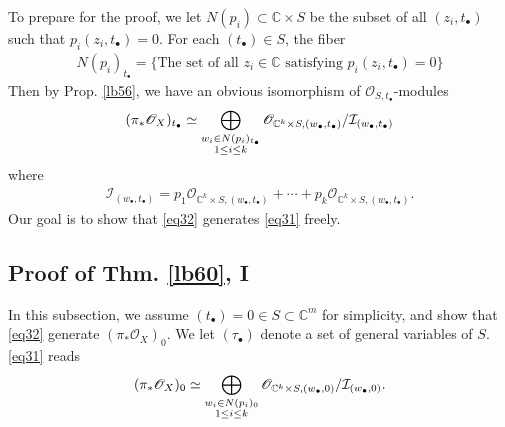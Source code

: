 \documentclass[12pt,b5paper,notitlepage]{report}
\theoremstyle{definition}
\theoremstyle{plain}
\newcommand{\mc}{\mathcal}
\newcommand{\scr}{\mathscr}
\newcommand{\blt}{\bullet}
\newcommand{\Cbb}{\mathbb C}
\numberwithin{equation}{section}
\begin{document}
To prepare for the proof, we let $N(p_i)\subset \Cbb\times S$ be the subset of all $(z_i,t_\blt)$ such that $p_i(z_i,t_\blt)=0$. For each $(t_\blt)\in S$, the fiber
\begin{align*}
N(p_i)_{t_\blt}=\{\text{The set of all  $z_i\in\Cbb$ satisfying $p_i(z_i,t_\blt)=0$}\}
\end{align*}
Then by Prop. \ref{lb56}, we have an obvious isomorphism of $\scr O_{S,t_\blt}$-modules
\begin{align}
(\pi_*\scr O_X)_{t_\blt}\simeq\bigoplus_{\begin{subarray}{c}
w_i\in N(p_i)_{t_\blt}\\
1\leq i\leq k
\end{subarray}} \scr O_{\Cbb^k\times S,(w_\blt,t_\blt)}/\mc I_{(w_\blt,t_\blt)}\label{eq31}
\end{align}
where
\begin{align*}
\mc I_{(w_\blt,t_\blt)}=p_1\scr O_{\Cbb^k\times S,(w_\blt,t_\blt)}+\cdots+p_k\scr O_{\Cbb^k\times S,(w_\blt,t_\blt)}.
\end{align*}
Our goal is to show that \eqref{eq32} generates \eqref{eq31} freely.


\subsection{Proof of Thm. \ref{lb60}, I}


In this subsection, we assume $(t_\blt)=0\in S\subset\Cbb^m$ for simplicity, and show that \eqref{eq32} generate $(\pi_*\scr O_X)_0$. We let $(\tau_\blt)$ denote a set of general variables of $S$. \eqref{eq31} reads
\begin{align}\label{eq33}
(\pi_*\scr O_X)_0\simeq\bigoplus_{\begin{subarray}{c}
w_i\in N(p_i)_0\\
1\leq i\leq k
\end{subarray}} \scr O_{\Cbb^k\times S,(w_\blt,0)}/\mc I_{(w_\blt,0)}.
\end{align}
\end{document}
